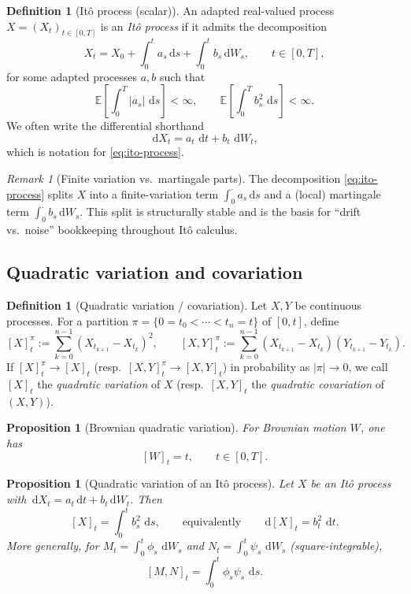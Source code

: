 \documentclass[11pt]{article}
\newcommand{\E}{\mathbb{E}}
\newcommand{\dd}{\,\mathrm{d}}
\newcommand{\1}{\mathbf{1}}
\theoremstyle{plain}
\newtheorem{proposition}[theorem]{Proposition}
\theoremstyle{definition}
\newtheorem{definition}[theorem]{Definition}
\theoremstyle{remark}
\newtheorem{remark}[theorem]{Remark}
\begin{document}
\begin{definition}[It\^o process (scalar)]
An adapted real-valued process $X=(X_t)_{t\in[0,T]}$ is an \emph{It\^o process} if it admits the decomposition
\begin{equation}\label{eq:ito-process}
X_t = X_0 + \int_0^t a_s \dd s + \int_0^t b_s \dd W_s,
\qquad t\in[0,T],
\end{equation}
for some adapted processes $a,b$ such that
\begin{equation}\label{eq:ito-integrability}
\E\!\left[\int_0^T |a_s|\,\dd s\right]<\infty,
\qquad
\E\!\left[\int_0^T b_s^2\,\dd s\right]<\infty.
\end{equation}
We often write the differential shorthand
\[
\dd X_t = a_t\,\dd t + b_t\,\dd W_t,
\]
which is notation for \eqref{eq:ito-process}.
\end{definition}

\begin{remark}[Finite variation vs.\ martingale parts]
The decomposition \eqref{eq:ito-process} splits $X$ into a finite-variation term $\int_0^\cdot a_s\dd s$
and a (local) martingale term $\int_0^\cdot b_s\dd W_s$. This split is structurally stable and is the basis
for ``drift vs.\ noise'' bookkeeping throughout It\^o calculus.
\end{remark}

\subsection{Quadratic variation and covariation}

\begin{definition}[Quadratic variation / covariation]
Let $X,Y$ be continuous processes. For a partition $\pi=\{0=t_0<\cdots<t_n=t\}$ of $[0,t]$, define
\[
[X]^{\pi}_t := \sum_{k=0}^{n-1} (X_{t_{k+1}}-X_{t_k})^2,
\qquad
[X,Y]^{\pi}_t := \sum_{k=0}^{n-1} (X_{t_{k+1}}-X_{t_k})(Y_{t_{k+1}}-Y_{t_k}).
\]
If $[X]^{\pi}_t \to [X]_t$ (resp.\ $[X,Y]^{\pi}_t \to [X,Y]_t$) in probability as $|\pi|\to 0$,
we call $[X]_t$ the \emph{quadratic variation} of $X$ (resp.\ $[X,Y]_t$ the \emph{quadratic covariation} of $(X,Y)$).
\end{definition}

\begin{proposition}[Brownian quadratic variation]\label{prop:brownian-qv}
For Brownian motion $W$, one has
\[
[W]_t = t,\qquad t\in[0,T].
\]
\end{proposition}

\begin{proposition}[Quadratic variation of an It\^o process]\label{prop:ito-qv}
Let $X$ be an It\^o process with $\dd X_t=a_t\dd t+b_t\dd W_t$.
Then
\begin{equation}\label{eq:qv-ito}
[X]_t = \int_0^t b_s^2\,\dd s,
\qquad\text{equivalently}\qquad
\dd[X]_t = b_t^2\,\dd t.
\end{equation}
More generally, for $M_t=\int_0^t \phi_s\,\dd W_s$ and $N_t=\int_0^t \psi_s\,\dd W_s$ (square-integrable),
\[
[M,N]_t = \int_0^t \phi_s\psi_s\,\dd s.
\]
\end{proposition}
\end{document}

